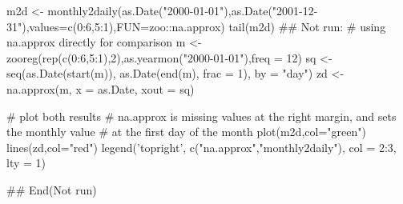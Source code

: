 \begin{Examples}
\begin{ExampleCode}
m2d <- monthly2daily(as.Date("2000-01-01"),as.Date("2001-12-31"),values=c(0:6,5:1),FUN=zoo::na.approx)
tail(m2d)
## Not run: 
# using na.approx directly for comparison
m <- zooreg(rep(c(0:6,5:1),2),as.yearmon("2000-01-01"),freq = 12)
sq <- seq(as.Date(start(m)), as.Date(end(m), frac = 1), by = "day")
zd <- na.approx(m, x = as.Date, xout = sq)

# plot both results
# na.approx is missing values at the right margin, and sets the monthly value
# at the first day of the month
plot(m2d,col="green")
lines(zd,col="red")
legend('topright', c("na.approx","monthly2daily"), col = 2:3, lty = 1)

## End(Not run)
\end{ExampleCode}
\end{Examples}
